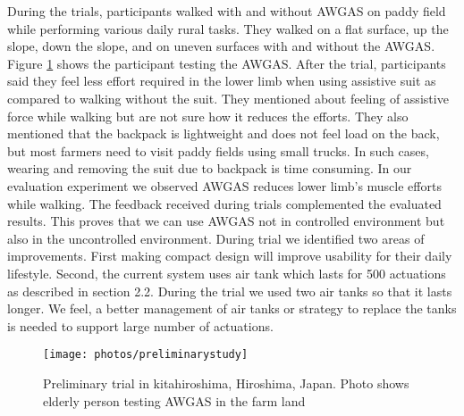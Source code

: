 \documentclass[paper,JRM,paper]{jaciiiarticle}
\begin{document}
During the trials, participants walked with and without AWGAS on paddy field while performing various daily rural tasks. They walked on a flat surface, up the slope, down the slope, and on uneven surfaces with and without the AWGAS. Figure \ref{fig:preliminarystudy} shows the participant testing the AWGAS. After the trial, participants said they feel less effort required in the lower limb when using assistive suit as compared to walking without the suit. They mentioned about feeling of assistive force while walking but are not sure how it reduces the efforts. They also mentioned that the backpack is lightweight and does not feel load on the back, but most farmers need to visit paddy fields using small trucks. In such cases, wearing and removing the suit due to backpack is time consuming. In our evaluation experiment we observed AWGAS reduces lower limb’s muscle efforts while walking. The feedback received during trials complemented the evaluated results. This proves that we can use AWGAS not in controlled environment but also in the uncontrolled environment. During trial we identified two areas of improvements. First making compact design will improve usability for their daily lifestyle. Second, the current system uses air tank which lasts for 500 actuations as described in section 2.2. During the trial we used two air tanks so that it lasts longer. We feel, a better management of air tanks or strategy to replace the tanks is needed to support large number of actuations. 


\begin{figure}[h]
	\centering
	\texttt{[image: photos/preliminarystudy]}
	\caption{Preliminary trial in kitahiroshima, Hiroshima, Japan. Photo shows elderly person testing AWGAS in the farm land}
	\label{fig:preliminarystudy}
\end{figure}
\end{document}
